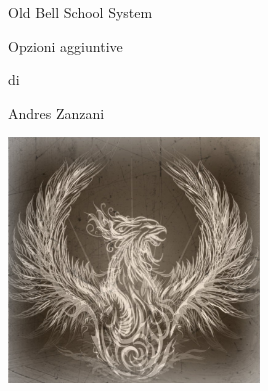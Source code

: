 \documentclass[a4paper,twoside,openany]{book}
\begin{document}
 
\def \versione {0.99} \fontsize{10}{12}\selectfont


{\Huge \begin{center} Old Bell School System \end{center}}

\bigskip

\begin{center}{\LARGE Opzioni aggiuntive}\\ \end{center}

\begin{center}di \end{center}

{\LARGE \begin{center} Andres Zanzani \end{center}}

\vspace{2cm}

\begin{center}
\includegraphics[keepaspectratio,width=0.50\textwidth]{immagini/copertina_old_scratch.png}
\end{center}

\vfill
\end{document}
